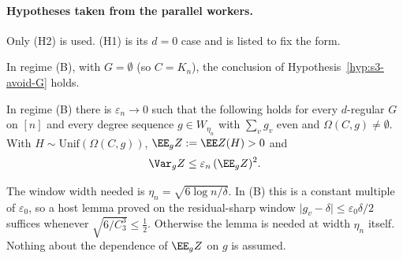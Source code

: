 \paragraph{Hypotheses taken from the parallel workers.}
Only (H2) is used. (H1) is its \(d=0\) case and is listed to fix the form.

\begin{hypothesis}
\label{hyp:s3-near-regular}
In regime (B), with \(G=\emptyset\) (so \(C=K_n\)), the conclusion of
Hypothesis~\ref{hyp:s3-avoid-G} holds.
\end{hypothesis}

\begin{hypothesis}
\label{hyp:s3-avoid-G}
In regime (B) there is \(\varepsilon_n\to0\) such that the following holds for every \(d\)-regular \(G\) on \([n]\)
and every degree sequence \(g\in W_{\eta_n}\) with \(\sum_vg_v\) even and
\(\Omega(C,g)\neq\emptyset\). With \(H\sim\mathrm{Unif}(\Omega(C,g))\),
\(\EE_gZ:=\EE Z(H)>0\) and
\[
\Var_g Z\le\varepsilon_n\,(\EE_gZ)^2 .
\]
\end{hypothesis}

The window width needed is \(\eta_n=\sqrt{6\log n/\delta}\). In (B) this is a constant
multiple of \(\varepsilon_0\), so a host lemma proved on the residual-sharp window
\(\lvert g_v-\delta\rvert\le\varepsilon_0\delta/2\) suffices whenever
\(\sqrt{6/C_3^3}\le\tfrac12\). Otherwise the lemma is needed at width \(\eta_n\)
itself. Nothing about the dependence of \(\EE_gZ\) on \(g\) is assumed.


